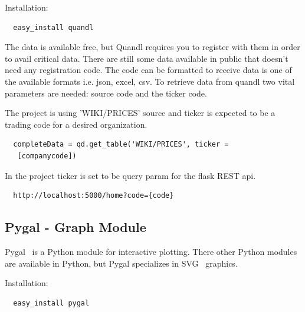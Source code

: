 Installation:

\begin{verbatim}
  easy_install quandl
\end{verbatim}
The data is available free, but Quandl requires you to register with them in
order to avail critical data. There are still some data available in public
that doesn’t need any registration code. The code can be formatted to receive
data is one of the available formats i.e. json, excel, csv. To retrieve data
from quandl two vital parameters are needed: source code and the ticker code.

The project is using 'WIKI/PRICES' source and ticker is expected to be a
trading code for a desired organization.
\begin{verbatim}
  completeData = qd.get_table('WIKI/PRICES', ticker =
   [companycode])
\end{verbatim}

In the project ticker is set to be query param for the flask REST api.
\begin{verbatim}
  http://localhost:5000/home?code={code}
\end{verbatim}
\subsection{Pygal - Graph Module}
Pygal~\cite{hid-sp18-417-Pygal} is a Python module for interactive plotting.
There other Python modules are available in Python, but Pygal specializes in
SVG~\cite{hid-sp18-417-SVG} graphics.

Installation:

\begin{verbatim}
  easy_install pygal
\end{verbatim}

